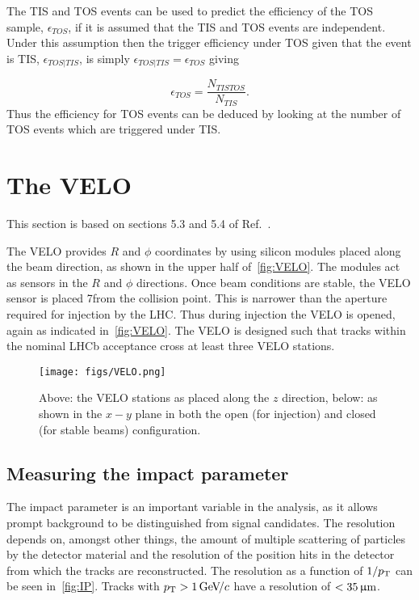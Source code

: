 The TIS and TOS events can be used to predict the efficiency of the TOS sample, $\epsilon_{TOS}$, if it is assumed that the TIS and TOS events are independent. Under this assumption then the trigger efficiency under TOS given that the event is TIS, $\epsilon_{TOS|TIS}$, is simply $\epsilon_{TOS|TIS} = \epsilon_{TOS} $ giving

\begin{equation}
  \epsilon_{TOS} = \frac{N_{TISTOS}}{N_{TIS}}.
\end{equation}
Thus the efficiency for TOS events can be deduced by looking at the number of TOS events which are triggered under TIS.


\FloatBarrier

\section{The VELO}
\label{sec:velo}
This section is based on sections 5.3 and 5.4 of Ref.~\cite{LHCb-DP-2014-001}.

The VELO provides $R$ and $\phi$ coordinates by using silicon modules placed along the beam direction, as shown in the upper half of~\autoref{fig:VELO}. The modules act as sensors in the $R$ and $\phi$ directions. Once beam conditions are stable, the VELO sensor is placed 7\mm from the collision point. This is narrower than the aperture required for injection by the LHC. Thus during injection the VELO is opened, again as indicated in~\autoref{fig:VELO}. The VELO is designed such that tracks within the nominal LHCb acceptance cross at least three VELO stations.
\begin{figure}[!h]
  \centering
    \texttt{[image: figs/VELO.png]} 
  \caption{Above: the VELO stations as placed along the $z$ direction, below: as shown in the $x-y$ plane in both the open (for injection) and closed (for stable beams) configuration\cite{det_paper}. %
  }
  \label{fig:VELO}
\end{figure}

\subsection{Measuring the impact parameter}
The impact parameter is an important variable in the \Lbpi analysis, as it allows \gls{prompt} background to be distinguished from signal candidates. The resolution depends on, amongst other things, the amount of multiple scattering of particles by the detector material and the resolution of the position hits in the detector from which the tracks are reconstructed. The resolution as a function of $1/\mbox{$p_{\rm T}$}$ can be seen in~\autoref{fig:IP}. Tracks with $\mbox{$p_{\rm T}$}>1{\mathrm{\,Ge\kern -0.1em V\!/}c}$ have a resolution of $<35{\,\upmu\rm m}$.


